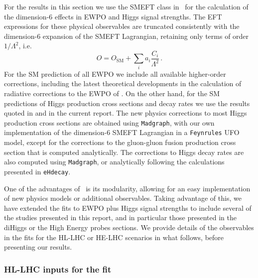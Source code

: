 For the results in this section we use the SMEFT class in \HEPfit~for 
the calculation of the dimension-6 effects in EWPO and Higgs signal strengths.
The EFT expressions for these physical observables are truncated
consistently with the dimension-6 expansion of the SMEFT Lagrangian, 
retaining only terms of order
$1/\Lambda^2$, i.e.
%
\begin{equation}
O=O_{\mathrm{SM}} + \sum_i a_i \frac{C_i}{\Lambda^2}\,.
\end{equation}
%
For the SM prediction of
all EWPO we include all available higher-order corrections, including the latest
theoretical developments in the calculation of radiative corrections
to the EWPO of \cite{Dubovyk:2016aqv,Dubovyk:2018rlg}.
On the other hand,  for the SM predictions of
Higgs production cross sections and decay rates we use the results
quoted in \cite{deFlorian:2016spz} and in the current report. 
The new physics corrections to most
Higgs production cross sections are obtained using {\tt Madgraph},
with our own implementation of the dimension-6 SMEFT Lagrangian in a
{\tt Feynrules} UFO model, except for the corrections to the
gluon-gluon fusion production cross section that is computed
analytically. The corrections to Higgs decay rates are
also computed using {\tt Madgraph}, or analytically following
the calculations presented in {\tt eHdecay}.

One of the advantages of \HEPfit~is its modularity, allowing for an
easy implementation of new physics models or additional observables.
Taking advantage of this, we have extended the fits to EWPO plus Higgs 
signal strengths to include several of the studies presented in this report, 
and in particular those presented in the diHiggs or the High Energy probes sections.
We provide details of the observables in the fits for the HL-LHC or HE-LHC 
scenarios in what follows, before presenting our results.


\subsubsection*{HL-LHC inputs for the fit}


